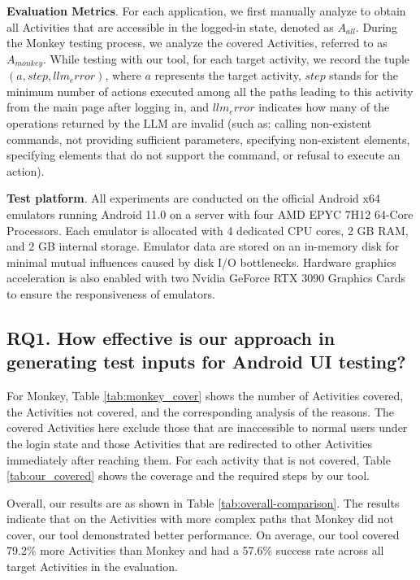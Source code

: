 \documentclass[conference]{IEEEtran}
\begin{document}
\textbf{Evaluation Metrics}. 
For each application, we first manually analyze to obtain all Activities that are accessible in the logged-in state, denoted as $A_{all}$. During the Monkey testing process, we analyze the covered Activities, referred to as $A_{monkey}$. While testing with our tool, for each target activity, we record the tuple $(a, step, llm_error)$, where $a$ represents the target activity, $step$ stands for the minimum number of actions executed among all the paths leading to this activity from the main page after logging in, and $llm_error$ indicates how many of the operations returned by the LLM are invalid (such as: calling non-existent commands, not providing sufficient parameters, specifying non-existent elements, specifying elements that do not support the command, or refusal to execute an action).

\textbf{Test platform}. All experiments are conducted on the official Android x64 emulators running Android 11.0 on a server with four AMD EPYC 7H12 64-Core Processors. Each emulator is allocated with 4 dedicated CPU cores, 2 GB RAM, and 2 GB internal storage. Emulator data are stored on an in-memory disk for minimal mutual influences caused by disk I/O bottlenecks. Hardware graphics acceleration is also enabled with two Nvidia GeForce RTX 3090 Graphics Cards to ensure the responsiveness of emulators.

\subsection{RQ1. How effective is our approach in generating test inputs for Android UI testing?}

For Monkey, Table \ref{tab:monkey_cover} shows the number of Activities covered, the Activities not covered, and the corresponding analysis of the reasons. The covered Activities here exclude those that are inaccessible to normal users under the login state and those Activities that are redirected to other Activities immediately after reaching them. For each activity that is not covered, Table \ref{tab:our_covered} shows the coverage and the required steps by our tool.

Overall, our results are as shown in Table \ref{tab:overall-comparison}. The results indicate that on the Activities with more complex paths that Monkey did not cover, our tool demonstrated better performance. On average, our tool covered 79.2\% more Activities than Monkey and had a 57.6\% success rate across all target Activities in the evaluation.
\end{document}
